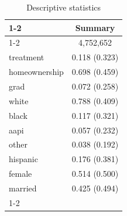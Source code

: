 \documentclass{article}
\begin{document}
\begin{table}[!h]
\caption{\color{blue}Descriptive statistics}
\centering
\begin{tabular}{ll}
\cline{1-2}
\multicolumn{1}{r}{} &
  \multicolumn{1}{c}{\textbf{Summary}} \\
\cline{1-2}
\multicolumn{1}{l}{N} &
  \multicolumn{1}{c}{4,752,652} \\
\multicolumn{1}{l}{treatment} &
  \multicolumn{1}{c}{0.118 (0.323)} \\
\multicolumn{1}{l}{homeownership} &
  \multicolumn{1}{c}{0.698 (0.459)} \\
\multicolumn{1}{l}{grad} &
  \multicolumn{1}{c}{0.072 (0.258)} \\
\multicolumn{1}{l}{white} &
  \multicolumn{1}{c}{0.788 (0.409)} \\
\multicolumn{1}{l}{black} &
  \multicolumn{1}{c}{0.117 (0.321)} \\
\multicolumn{1}{l}{aapi} &
  \multicolumn{1}{c}{0.057 (0.232)} \\
\multicolumn{1}{l}{other} &
  \multicolumn{1}{c}{0.038 (0.192)} \\
\multicolumn{1}{l}{hispanic} &
  \multicolumn{1}{c}{0.176 (0.381)} \\
\multicolumn{1}{l}{female} &
  \multicolumn{1}{c}{0.514 (0.500)} \\
\multicolumn{1}{l}{married} &
  \multicolumn{1}{c}{0.425 (0.494)} \\
\cline{1-2}
\end{tabular}
\end{table}
\end{document}
